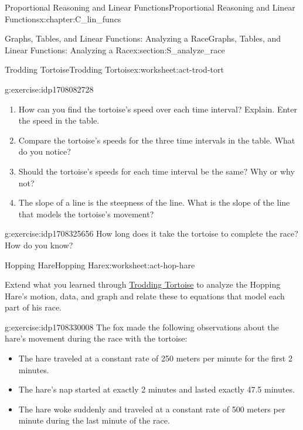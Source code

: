 \documentclass[oneside,10pt,]{book}
\numberwithin{equation}{chapter}
\begin{document}
\begin{chapterptx}{Proportional Reasoning and Linear Functions}{}{Proportional Reasoning and Linear Functions}{}{}{x:chapter:C_lin_funcs}
\begin{sectionptx}{Graphs, Tables, and Linear Functions: Analyzing a Race}{}{Graphs, Tables, and Linear Functions: Analyzing a Race}{}{}{x:section:S_analyze_race}
\begin{worksheet-subsection}{Trodding Tortoise}{}{Trodding Tortoise}{}{}{x:worksheet:act-trod-tort}
\begin{divisionexercise}{4}{}{}{g:exercise:idp1708082728}
\begin{enumerate}[font=\bfseries,label=(\alph*),ref=\alph*]
\begin{tableptx}{\textbf{The Tortoise's Travels Over Time}}{x:table:tbl-tort-travels}{}
{}%
\end{tableptx}%
\item{}How can you find the tortoise's speed over each time interval? Explain. Enter the speed in the table.%
\item{}Compare the tortoise's speeds for the three time intervals in the table. What do you notice?%
\item{}Should the tortoise's speeds for each time interval be the same? Why or why not?%
\item\label{x:task:exer-slope-def}The slope of a line is the steepness of the line. What is the slope of the line that models the tortoise's movement?%
\end{enumerate}
\end{divisionexercise}%
\begin{divisionexercise}{5}{}{}{g:exercise:idp1708325656}%
How long does it take the tortoise to complete the race? How do you know?%
\end{divisionexercise}%
\end{worksheet-subsection}
\restoregeometry
%
%
\typeout{************************************************}
\typeout{************************************************}
%
\begin{worksheet-subsection}{Hopping Hare}{}{Hopping Hare}{}{}{x:worksheet:act-hop-hare}
\begin{introduction}{}%
Extend what you learned through \hyperref[x:worksheet:act-trod-tort]{Trodding Tortoise} to analyze the Hopping Hare's motion, data, and graph and relate these to equations that model each part of his race.%
\end{introduction}%
\begin{divisionexercise}{1}{}{}{g:exercise:idp1708330008}%
The fox made the following observations about the hare's movement during the race with the tortoise:%
\begin{itemize}[label=\textbullet]
\item{}The hare traveled at a constant rate of 250 meters per minute for the first 2 minutes.%
\item{}The hare's nap started at exactly 2 minutes and lasted exactly 47.5 minutes.%
\item{}The hare woke suddenly and traveled at a constant rate of 500 meters per minute during the last minute of the race.%
\end{itemize}
%
\begin{enumerate}[font=\bfseries,label=(\alph*),ref=\alph*]

\end{enumerate}
\end{divisionexercise}
\end{worksheet-subsection}
\end{sectionptx}
\end{chapterptx}
\end{document}
